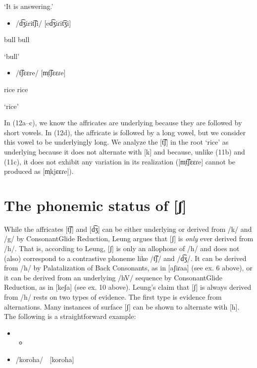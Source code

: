 \textsc{    ‘}It is answering.’

\begin{itemize}
\item /d͡ʒirit͡ʃi/  [ed͡ʒiɾit͡ʒi]

\end{itemize}

bull  bull

    ‘bull’

\begin{itemize}
\item /t͡ʃɛɛre/  [m̩t͡ʃɛɛɾe]

\end{itemize}

rice  rice

    ‘rice’

In (12a–c), we know the affricates are underlying because they are followed by short vowels. In (12d), the affricate is followed by a long vowel, but we consider this vowel to be underlyingly long. We analyze the [t͡ʃ] in the root ‘rice’ as underlying because it does not alternate with [k] and because, unlike (11b) and (11c), it does not exhibit any variation in its realization ([m̩t͡ʃɛɛɾe] cannot be produced as [m̩kjɛɛɾe]).

\section{The phonemic status of [ʃ]} %

While the affricates [t͡ʃ] and [d͡ʒ] can be either underlying or derived from /k/ and /g/ by ConsonantGlide Reduction, Leung argues that [ʃ] is \textit{only} ever derived from /h/. That is, according to Leung, [ʃ] is only an allophone of /h/ and does not (also) correspond to a contrastive phoneme like /t͡ʃ/ and /d͡ʒ/. It can be derived from /h/ by Palatalization of Back Consonants, as in [aʃiɾaa] (see ex. 6 above), or it can be derived from an underlying /hV/ sequence by ConsonantGlide Reduction, as in [keʃa] (see ex. 10 above). Leung’s claim that [ʃ] is always derived from /h/ rests on two types of evidence. The first type is evidence from alternations. Many instances of surface [ʃ] can be shown to alternate with [h]. The following is a straightforward example:

\setcounter{itemize}{0}
\begin{itemize}
\item \setcounter{itemize}{0}
\begin{itemize}
\item \end{itemize}
\end{itemize}
\setcounter{itemize}{0}
\begin{itemize}
\item /koroha/    [koroha]

\end{itemize}

